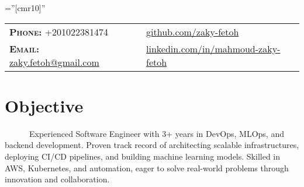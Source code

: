 \documentclass[a4paper,10pt]{article}
\begin{document}
\pagestyle{fancy}
\fancyhead{} 
\renewcommand{\headrulewidth}{0pt}

\font\fb=''[cmr10]'' 
\par{\bigskip\par} %


\begin{tabular}{lp{4cm}l}
\textbf{\textsc{Phone:}} +201022381474 && \href{https://github.com/zaky-fetoh}{github.com/zaky-fetoh} \\
\textbf{\textsc{Email:}}   \href{mailto:zaky.fetoh@gmail.com}{zaky.fetoh@gmail.com} &&\href{https://www.linkedin.com/in/mahmoud-zaky-fetoh/}{linkedin.com/in/mahmoud-zaky-fetoh}\\

\end{tabular}

\section{\textbf{Objective}}
~~~~~~Experienced Software Engineer with 3+ years in DevOps, MLOps, and backend development. Proven track record of architecting scalable infrastructures, deploying CI/CD pipelines, and building machine learning models. Skilled in AWS, Kubernetes, and automation, eager to solve real-world problems through innovation and collaboration.


\end{document}
